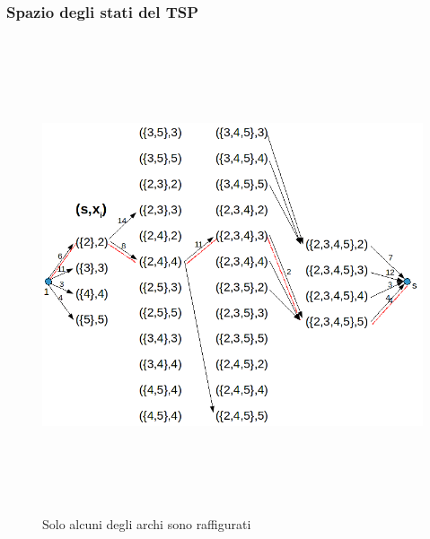 \newpage
\subsubsection{Spazio degli stati del TSP}
\begin{figure}[h]
	\includegraphics[height=14cm]{images/graph41.png}
	\caption{Solo alcuni degli archi sono raffigurati}
\end{figure}


